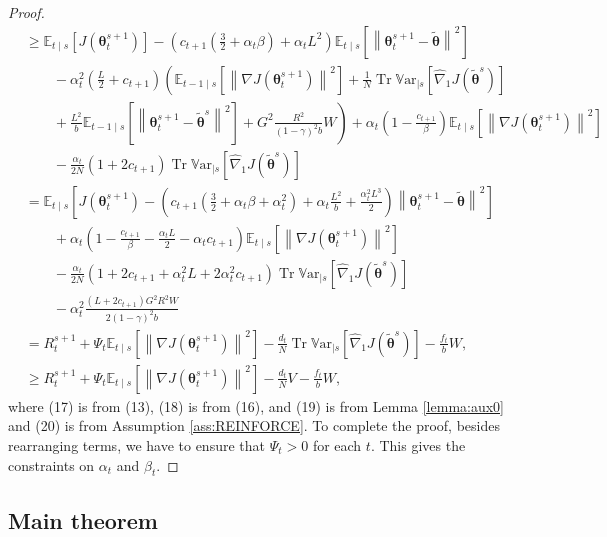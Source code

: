 \documentclass{article}
\theoremstyle{remark}
\theoremstyle{definition}
\DeclareMathOperator{\Tr}{Tr}
\newcommand{\norm}[2][\infty]{\left\|#2\right\|_{#1}}
\newcommand{\vtheta}{\boldsymbol{\theta}}
\newcommand{\gradJ}[1]{\nabla J(#1)}
\newcommand{\gradApp}[2]{\hat{\nabla}_{#2}J(#1)}
\newcommand{\Ets}[2][t]{\mathbb{E}_{#1\mid s}\left[#2\right]}
\newcommand{\Varts}[2][t]{{\mathbb{V}\text{ar}}_{#1\mid s}\left[#2\right]}
\begin{document}
\begin{proof}
\begin{align}
	&\geq  \Ets{J(\vtheta_t^{s+1})} - \left(c_{t+1}\left(\frac{3}{2}+\alpha_t\beta\right)+\alpha_tL^2\right)\Ets{\norm[]{\vtheta_{t}^{s+1}-\tilde{\vtheta}}^2} \nonumber\\
	&\qquad
	-\alpha_t^2\left(\frac{L}{2}+c_{t+1}\right)\left(\Ets[t-1]{\norm[]{\gradJ{\vtheta_t^{s+1}}}^2} 
	+\frac{1}{N}\Tr\Varts[]{\gradApp{\tilde{\vtheta}^s}{1}}
	\right.\nonumber\\
	&\left.\qquad+\frac{L^2}{b}\Ets[t-1]{\norm[]{\vtheta_t^{s+1}-\tilde{\vtheta}^s}^2}
	+G^2\frac{R^2}{(1-\gamma)^2b}W\right)
	+\alpha_t\left(1-\frac{c_{t+1}}{\beta}\right)\Ets{\norm[]{\gradJ{\vtheta_t^{s+1}}}^2} \nonumber\\
	&\qquad-\frac{\alpha_t}{2N}\left(1+2c_{t+1}\right)\Tr\Varts[]{\gradApp{\tilde{\vtheta}^s}{1}} \\
	& = \Ets{J(\vtheta_t^{s+1}) - \left(c_{t+1}\left(\frac{3}{2}+\alpha_t\beta+\alpha_t^2\right)+\alpha_t\frac{L^2}{b}+\frac{\alpha_t^2L^3}{2}\right)\norm[]{\vtheta_{t}^{s+1}-\tilde{\vtheta}}^2} \nonumber\\
	&\qquad
	+\alpha_t\left(1-\frac{c_{t+1}}{\beta}-\frac{\alpha_tL}{2}-\alpha_tc_{t+1}\right)\Ets{\norm[]{\gradJ{\vtheta_t^{s+1}}}^2} \nonumber\\
	&\qquad-\frac{\alpha_t}{2N}\left(1+2c_{t+1}+\alpha_t^2L+2\alpha_t^2c_{t+1}\right)\Tr\Varts[]{\gradApp{\tilde{\vtheta}^s}{1}} \nonumber\\
	&\qquad-\alpha_t^2\frac{(L+2c_{t+1})G^2R^2W}{2(1-\gamma)^2b} \nonumber\\
	&= R_t^{s+1}
	+\Psi_t\Ets{\norm[]{\gradJ{\vtheta_t^{s+1}}}^2}
	-\frac{d_t}{N}\Tr\Varts[]{\gradApp{\tilde{\vtheta}^s}{1}}
	-\frac{f_t}{b}W,\nonumber\\
	&\geq R_t^{s+1}
	+\Psi_t\Ets{\norm[]{\gradJ{\vtheta_t^{s+1}}}^2}
	-\frac{d_t}{N}V
	-\frac{f_t}{b}W,
\end{align}
where (17) is from (13), (18) is from (16), and (19) is from Lemma \ref{lemma:aux0} and (20) is from Assumption \ref{ass:REINFORCE}.
To complete the proof, besides rearranging terms, we have to ensure that $\Psi_t>0$ for each $t$. This gives the constraints on $\alpha_t$ and $\beta_t$.
\end{proof}


\subsection*{Main theorem}
\end{document}
